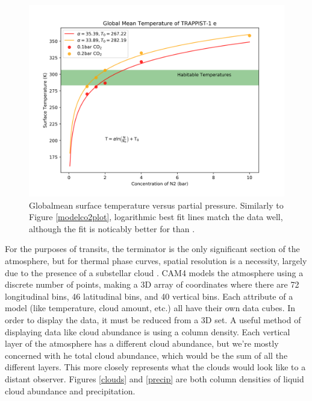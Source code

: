 \begin{figure}[htbp]
    \begin{center}
        \includegraphics[width=\textwidth]{models/surfacet_n2.png}
        \caption[Globalmean Surface Temperature Versus  Partial
        Pressure]{Globalmean surface temperature versus  partial
        pressure. Similarly to Figure \ref{modelco2plot}, logarithmic best fit
        lines match the data well, although the fit is noticably better for
         than .}
        \label{modeln2plot}
    \end{center}
\end{figure}

For the purposes of transits, the terminator is the only significant section of
 the atmosphere, but for thermal phase curves, spatial resolution is a
 necessity, largely due to the presence of a substellar cloud
 \citep{ravihabitablemoist}. CAM4 models the atmosphere using a discrete number
 of points, making a 3D array of coordinates where there are 72 longitudinal
 bins, 46 latitudinal bins, and 40 vertical bins. Each attribute of a model
 (like temperature, cloud amount, etc.) all have their own data cubes. In order
 to display the data, it must be reduced from a 3D set. A useful method of
 displaying data like cloud abundance is using a column density. Each vertical
 layer of the atmosphere has a different cloud abundance, but we're mostly
 concerned with \texttt{}he total cloud abundance, which would be the sum of all the
 different layers. This more closely represents what the clouds would look like
 to a distant observer. Figures \ref{clouds} and \ref{precip} are both column
 densities of liquid cloud abundance and precipitation.

